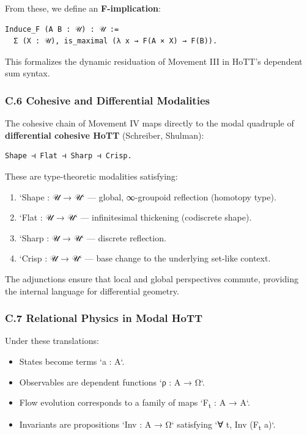 \documentclass[11pt]{article}
\begin{document}
From these, we define an \textbf{F-implication}:

\begin{verbatim}
Induce_F (A B : 𝒰) : 𝒰 :=
  Σ (X : 𝒰), is_maximal (λ x → F(A × X) → F(B)).
\end{verbatim}

This formalizes the dynamic residuation of Movement III in HoTT’s dependent sum syntax.
\subsubsection*{C.6 Cohesive and Differential Modalities}
\label{sec:orge060ce7}
The cohesive chain of Movement IV  
maps directly to the modal quadruple of \textbf{differential cohesive HoTT} (Schreiber, Shulman):

\begin{verbatim}
Shape ⊣ Flat ⊣ Sharp ⊣ Crisp.
\end{verbatim}

These are type-theoretic modalities satisfying:

\begin{enumerate}
\item `Shape : 𝒰 → 𝒰` — global, ∞-groupoid reflection (homotopy type).
\item `Flat : 𝒰 → 𝒰` — infinitesimal thickening (codiscrete shape).
\item `Sharp : 𝒰 → 𝒰` — discrete reflection.
\item `Crisp : 𝒰 → 𝒰` — base change to the underlying set-like context.
\end{enumerate}

The adjunctions ensure that local and global perspectives commute,  
providing the internal language for differential geometry.
\subsubsection*{C.7 Relational Physics in Modal HoTT}
\label{sec:org60e8b49}
Under these translations:
\begin{itemize}
\item States become terms `a : A`.
\item Observables are dependent functions `ρ : A → Ω`.
\item Flow evolution corresponds to a family of maps `F\textsubscript{t} : A → A`.
\item Invariants are propositions `Inv : A → Ω`  
satisfying `∀ t, Inv (F\textsubscript{t} a)`.
\end{itemize}
\end{document}
